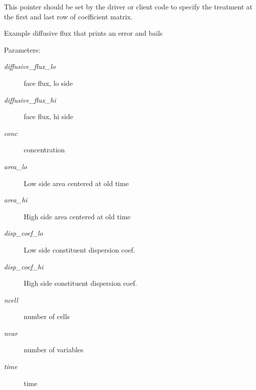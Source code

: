 This pointer should be set by the driver or client code to specify the treatment at the first and last row of coefficient matrix. 

Example diffusive flux that prints an error and bails \begin{Desc}
\item[Parameters:]
\begin{description}
\item[{\em diffusive\_\-flux\_\-lo}]face flux, lo side\item[{\em diffusive\_\-flux\_\-hi}]face flux, hi side\item[{\em conc}]concentration \item[{\em area\_\-lo}]Low side area centered at old time\item[{\em area\_\-hi}]High side area centered at old time\item[{\em disp\_\-coef\_\-lo}]Low side constituent dispersion coef.\item[{\em disp\_\-coef\_\-hi}]High side constituent dispersion coef.\item[{\em ncell}]number of cells\item[{\em nvar}]number of variables\item[{\em time}]time \end{description}
\end{Desc}
